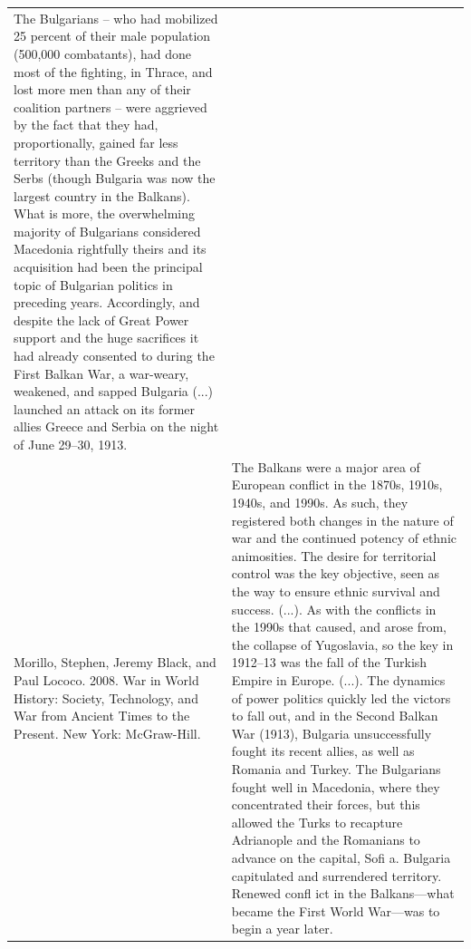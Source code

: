 {\begin{longtable}{p{}p{}}
The Bulgarians – who had mobilized 25 percent of their male population (500,000 combatants), had done most of the fighting, in Thrace, and lost more men than any of their coalition partners – were aggrieved by the fact that they had, proportionally, gained far less territory than the Greeks and the Serbs (though Bulgaria was now the largest country in the Balkans). What is more, the overwhelming majority of Bulgarians considered Macedonia rightfully theirs and its acquisition had been the principal topic of Bulgarian politics in preceding years. Accordingly, and despite the lack of Great Power support and the huge sacrifices it had already consented to during the First Balkan War, a war-weary, weakened, and sapped Bulgaria (...) launched an attack on its former allies Greece and Serbia on the night of June 29–30, 1913.
\\
Morillo, Stephen, Jeremy Black, and Paul Lococo. 2008. War in World History: Society, Technology, and War from Ancient Times to the Present. New York: McGraw-Hill. & The Balkans were a major area of European conflict in the 1870s, 1910s, 1940s, and 1990s. As
such, they registered both changes in the nature of war and the continued potency of ethnic animosities. The desire for territorial control was the key objective, seen as the way to ensure ethnic survival and success. (...). As with the conflicts in the 1990s that caused, and arose from, the collapse of Yugoslavia, so the key in 1912–13 was the fall of the Turkish Empire in Europe. (...). The dynamics of power politics quickly led the victors to fall out, and in the Second Balkan War (1913), Bulgaria unsuccessfully fought its recent allies, as well as Romania and Turkey. The Bulgarians fought well in Macedonia, where they concentrated their forces, but this allowed the Turks to recapture Adrianople and the Romanians to advance on the capital, Sofi a. Bulgaria capitulated and surrendered territory. Renewed confl ict in the Balkans—what became the First World War—was to begin a year later.


\end{longtable}}
